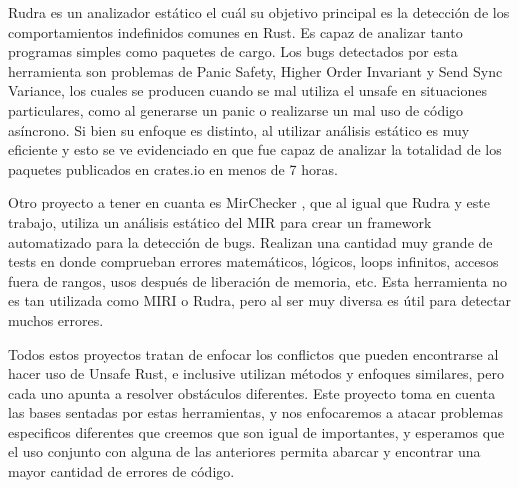 Rudra \cite{rudra} es un analizador estático el cuál su objetivo principal es la detección de los comportamientos indefinidos comunes en Rust. Es capaz de analizar tanto programas simples como paquetes de cargo. Los bugs detectados por esta herramienta son problemas de Panic Safety, Higher Order Invariant y Send Sync Variance, los cuales se producen cuando se mal utiliza el unsafe en situaciones particulares, como al generarse un panic o realizarse un mal uso de código asíncrono. Si bien su enfoque es distinto, al utilizar análisis estático es muy eficiente y esto se ve evidenciado en que fue capaz de analizar la totalidad de los paquetes publicados en crates.io en menos de 7 horas.

Otro proyecto a tener en cuanta es MirChecker \cite{li2021mirchecker}, que al igual que Rudra y este trabajo, utiliza un análisis estático del MIR para crear un framework automatizado para la detección de bugs. Realizan una cantidad muy grande de tests en donde comprueban errores matemáticos, lógicos, loops infinitos, accesos fuera de rangos, usos después de liberación de memoria, etc. Esta herramienta no es tan utilizada como MIRI o Rudra, pero al ser muy diversa es útil para detectar muchos errores.

Todos estos proyectos tratan de enfocar los conflictos que pueden encontrarse al hacer uso de Unsafe Rust, e inclusive utilizan métodos y enfoques similares, pero cada uno apunta a resolver obstáculos diferentes. Este proyecto toma en cuenta las bases sentadas por estas herramientas, y nos enfocaremos a atacar problemas especificos diferentes que creemos que son igual de importantes, y esperamos que el uso conjunto con alguna de las anteriores permita abarcar y encontrar una mayor cantidad de errores de código.






